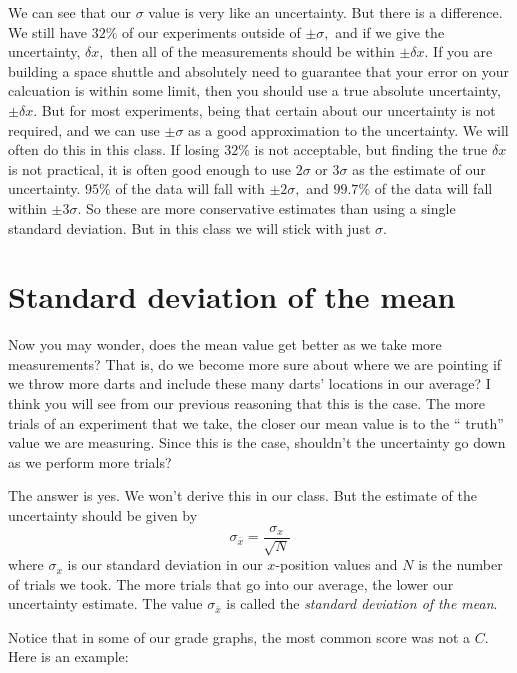\documentclass[twoside,11pt,ShortChapTitles]{BYUTextbook}
\begin{document}
We can see that our $\sigma $ value is very like an uncertainty. But there
is a difference. We still have $32\%$ of our experiments outside of $\pm
\sigma ,$ and if we give the uncertainty, $\delta x,$ then all of the
measurements should be within $\pm \delta x.$ If you are building a space
shuttle and absolutely need to guarantee that your error on your calcuation
is within some limit, then you should use a true absolute uncertainty, $\pm
\delta x.$ But for most experiments, being that certain about our
uncertainty is not required, and we can use $\pm \sigma $ as a good
approximation to the uncertainty. We will often do this in this class. If
losing $32\%$ is not acceptable, but finding the true $\delta x$ is not
practical, it is often good enough to use $2\sigma $ or $3\sigma $ as the
estimate of our uncertainty. $95\%$ of the data will fall with $\pm 2\sigma
, $ and $99.7\%$ of the data will fall within $\pm 3\sigma .$ So these are
more conservative estimates than using a single standard deviation. But in
this class we will stick with just $\sigma .$

\section{Standard deviation of the mean}

Now you may wonder, does the mean value get better as we take more
measurements? That is, do we become more sure about where we are pointing if
we throw more darts and include these many darts' locations in our average?
I think you will see from our previous reasoning that this is the case. The
more trials of an experiment that we take, the closer our mean value is to
the `` truth'' value we are measuring. Since
this is the case, shouldn't the uncertainty go down as we perform more
trials?

The answer is yes. We won't derive this in our class. But the estimate of
the uncertainty should be given by
\[
\sigma _{\bar{x}}=\frac{\sigma _{x}}{\sqrt{N}}
\]%
where $\sigma _{x}$ is our standard deviation in our $x$-position values and
$N$ is the number of trials we took. The more trials that go into our
average, the lower our uncertainty estimate. The value $\sigma _{\bar{x}}$
is called the \emph{standard deviation of the mean}.

Notice that in some of our grade graphs, the most common score was not a $C.$
Here is an example:
\end{document}
